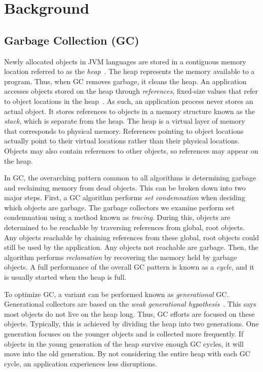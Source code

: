 \documentclass{sig-alternate}
\begin{document}
\section{Background}
\label{sec:background}


\subsection{Garbage Collection (GC)}
\label{sec:garbageCollection}

Newly allocated objects in JVM languages are stored in a contiguous memory location referred
to as the \emph{heap}~\cite{oracle:heap}. The heap represents the memory available to a program.
Thus, when GC removes garbage, it cleans the heap.
An application accesses objects stored on the heap through \emph{references},
fixed-size values that refer to object locations in the heap~\cite{reilly:reference}. 
As such, an application process never stores
an actual object. It stores references to objects in a memory structure known
as the \emph{stack}, which is separate from the heap.
The heap is a virtual layer of memory that corresponds to physical memory.
References pointing to object locations actually point to their
virtual locations rather than their physical locations. Objects may also 
contain references to other objects, so references may appear on the heap.

In GC, the overarching pattern common to all algorithms is determining garbage
and reclaiming memory from dead objects. This can be broken down into two major steps.
First, a GC algorithm performs \emph{set condemnation} when deciding which objects are 
garbage. The garbage collectors we examine perform set condemnation using a method 
known as \emph{tracing}. During this, objects are determined to be reachable by 
traversing references from global, root objects. Any objects reachable by chaining references
from these global, root objects could still be used by the application. 
Any objects not reachable are garbage. Then, the algorithm performs 
\emph{reclamation} by recovering the memory held by garbage objects. A full
performance of the overall GC pattern is known as a \emph{cycle}, and it
is usually started when the heap is full.

To optimize GC, a variant can be performed known as \emph{generational} GC.
Generational collectors are based on the \emph{weak generational hypothesis}~\cite{Tene:C4}.
This says most objects do not live on the 
heap long. Thus, GC efforts are focused on these objects. Typically, this is achieved
by dividing the heap into two generations. One generation focuses on the younger objects and
is collected more frequently. If objects in the young generation of the heap survive
enough GC cycles, it will move into the old generation. By not considering the entire
heap with each GC cycle, an application experiences less disruptions.
\end{document}

